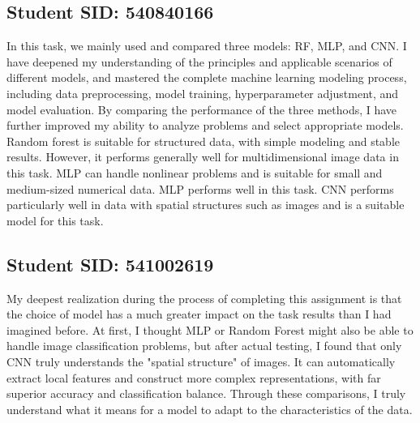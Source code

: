 \subsection{Student SID: 540840166}

\noindent 

In this task, we mainly used and compared three models: RF, MLP, and CNN. I have deepened my understanding of the principles and applicable scenarios of different models, and mastered the complete machine learning modeling process, including data preprocessing, model training, hyperparameter adjustment, and model evaluation. By comparing the performance of the three methods, I have further improved my ability to analyze problems and select appropriate models. Random forest is suitable for structured data, with simple modeling and stable results. However, it performs generally well for multidimensional image data in this task. MLP can handle nonlinear problems and is suitable for small and medium-sized numerical data. MLP performs well in this task. CNN performs particularly well in data with spatial structures such as images and is a suitable model for this task.

\subsection{Student SID: 541002619}

\noindent 

My deepest realization during the process of completing this assignment is that the choice of model has a much greater impact on the task results than I had imagined before. At first, I thought MLP or Random Forest might also be able to handle image classification problems, but after actual testing, I found that only CNN truly understands the "spatial structure" of images. It can automatically extract local features and construct more complex representations, with far superior accuracy and classification balance. Through these comparisons, I truly understand what it means for a model to adapt to the characteristics of the data.

